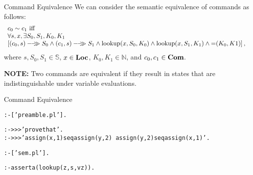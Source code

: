 \documentclass{beamer}
\begin{document}
\begin{frame}[fragile]{Command Equivalence}
\scriptsize
We can consider the semantic equivalence of commands as follows:
\[
\begin{array}{l}
c_0 \sim c_1 \mbox{ iff }\\
 \forall s, x,\exists S_0,S_1,K_0,K_1\\
 \left[ \sem{(c_0,s)}{S_0}\wedge \sem{(c_1,s)}{S_1} \wedge  \mbox{lookup}(x,S_0,K_0) \wedge \mbox{lookup}(x,S_1,K_1)\wedge \mbox{=}(K_0,K1)\right ],
\end{array}
\]
where $s,S_0,S_1\in\mathbb{S}$, $x\in\mbox{\bf Loc}$,
$K_0,K_1\in \mathbb{N}$, and $c_0, c_1 \in \mbox{\bf Com}$.

\vspace{.1in}

{\bf NOTE:} Two commands are equivalent if they result in states that are indistinguishable 
under variable evaluations.
\end{frame}

\begin{frame}[fragile]{Command Equivalence}
\scriptsize
\begin{alltt}
% proof-equiv-command.pl

:- ['preamble.pl'].

:- >>> 'prove that'.
:- >>> '   assign(x,1) seq assign(y,2) ~ assign(y,2) seq assign(x,1)'.

% We need to show that
% (forall s,z)(exist S0,S1,V0,V1)
%     [(assign(x,1) seq assign(y,2),s)-->>S0 ^                                                  
%      (assign(y,2) seq assign(x,1),s)-->>S1 ^
%      lookup(z,S0,V0) ^ lookup(z,S1,V1) ^ =(V0,V1)]
% assume lookup(z,s,vz)                                                                         
                                                                                                
%load semantics                                                                                 
:- ['sem.pl'].                                                                                  
                                                                                                
% assumption                                                                                    
:- asserta(lookup(z,s,vz)).

\end{alltt}
\end{frame}
\end{document}
